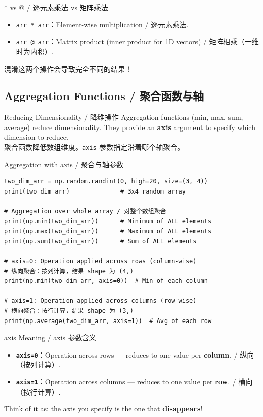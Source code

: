 \documentclass[11pt,a4paper]{article}
\begin{document}
\begin{warning}{* vs @ / 逐元素乘法 vs 矩阵乘法}
    \begin{itemize}[itemsep=0.3em]
        \item \texttt{arr * arr}：Element-wise multiplication / 逐元素乘法.
        \item \texttt{arr @ arr}：Matrix product (inner product for 1D vectors) / 矩阵相乘（一维时为内积）.
    \end{itemize}
    混淆这两个操作会导致完全不同的结果！
\end{warning}

\subsection{Aggregation Functions / 聚合函数与轴}

\begin{concept}{Reducing Dimensionality / 降维操作}
    Aggregation functions (min, max, sum, average) reduce dimensionality. They provide an \textbf{axis} argument to specify which dimension to reduce. \\
    聚合函数降低数组维度。\texttt{axis} 参数指定沿着哪个轴聚合。
\end{concept}

\begin{examplebox}{Aggregation with axis / 聚合与轴参数}
\begin{lstlisting}
two_dim_arr = np.random.randint(0, high=20, size=(3, 4))
print(two_dim_arr)              # 3x4 random array

# Aggregation over whole array / 对整个数组聚合
print(np.min(two_dim_arr))      # Minimum of ALL elements
print(np.max(two_dim_arr))      # Maximum of ALL elements
print(np.sum(two_dim_arr))      # Sum of ALL elements

# axis=0: Operation applied across rows (column-wise)
# 纵向聚合：按列计算，结果 shape 为 (4,)
print(np.min(two_dim_arr, axis=0))  # Min of each column

# axis=1: Operation applied across columns (row-wise)
# 横向聚合：按行计算，结果 shape 为 (3,)
print(np.average(two_dim_arr, axis=1))  # Avg of each row
\end{lstlisting}
\end{examplebox}

\begin{warning}{axis Meaning / axis 参数含义}
    \begin{itemize}
        \item \textbf{\texttt{axis=0}}：Operation across rows — reduces to one value per \textbf{column}. / 纵向（按列计算）.
        \item \textbf{\texttt{axis=1}}：Operation across columns — reduces to one value per \textbf{row}. / 横向（按行计算）.
    \end{itemize}
    Think of it as: the axis you specify is the one that \textbf{disappears}!
\end{warning}
\end{document}
